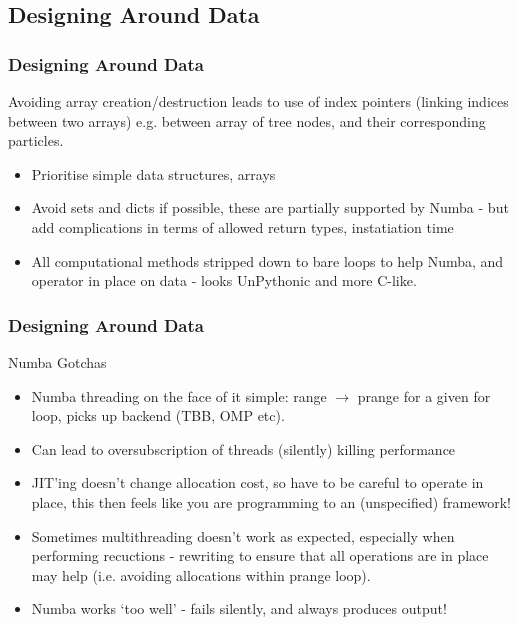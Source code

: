 \subsection{Designing Around Data}

\begin{frame}
    \frametitle{Designing Around Data}
    Avoiding array creation/destruction leads to use of index pointers (linking indices between two arrays) e.g. between array of tree nodes, and their corresponding particles.
    \begin{itemize}
        \item Prioritise simple data structures, arrays
        \item Avoid sets and dicts if possible, these are partially supported by Numba - but add complications in terms of allowed return types, instatiation time
        \item All computational methods stripped down to bare loops to help Numba, and operator in place on data - looks UnPythonic and more C-like.
    \end{itemize}
\end{frame}

\begin{scriptsize}
\begin{frame}
    \frametitle{Designing Around Data}
    Numba Gotchas
    \begin{itemize}
        \item Numba threading on the face of it simple: range $\rightarrow$ prange for a given for loop, picks up backend (TBB, OMP etc).
        \item Can lead to oversubscription of threads (silently) killing performance
        \item JIT'ing doesn't change allocation cost, so have to be careful to operate in place, this then feels like you are programming to an (unspecified) framework!
        \item Sometimes multithreading doesn't work as expected, especially when performing recuctions - rewriting to ensure that all operations are in place may help (i.e. avoiding allocations within prange loop).
        \item Numba works `too well' - fails silently, and always produces output!
    \end{itemize}
\end{frame}
\end{scriptsize}

